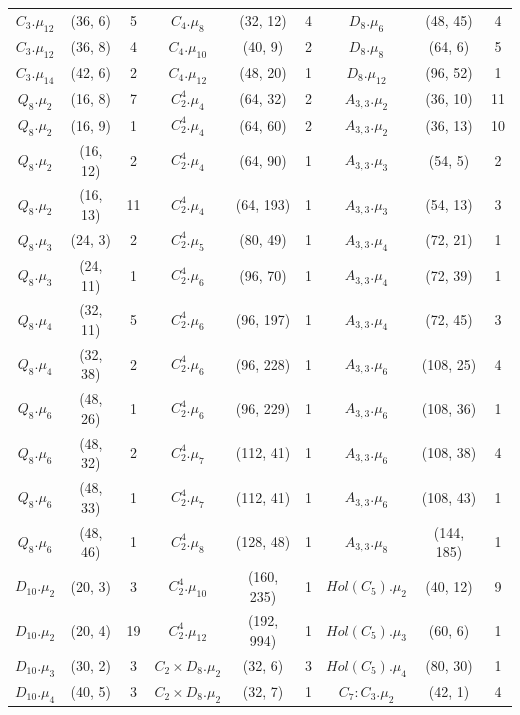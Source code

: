 \documentclass[a4paper]{amsart}
\theoremstyle{definition}
\theoremstyle{plain}
\begin{document}
{\begin{longtable}{ccc|ccc|ccc}
$C_3.\mu_{12}$&(36, 6)&5   &  $C_4.\mu_{8}$&(32, 12)&4 & $D_8.\mu_{6}$&(48, 45)&4\\
\rowcolor{lightgray}
$C_3.\mu_{12}$&(36, 8)&4   &  $C_4.\mu_{10}$&(40, 9)&2 & $D_8.\mu_{8}$&(64, 6)&5\\
$C_3.\mu_{14}$&(42, 6)&2   &  $C_4.\mu_{12}$&(48, 20)&1 & $D_8.\mu_{12}$&(96, 52)&1\\
\rowcolor{lightgray}
$Q_8.\mu_{2}$&(16, 8)&7 & $C_2^4.\mu_{4}$&(64, 32)&2 & $A_{3,3}.\mu_{2}$&(36, 10)&11\\
$Q_8.\mu_{2}$&(16, 9)&1 & $C_2^4.\mu_{4}$&(64, 60)&2 & $A_{3,3}.\mu_{2}$&(36, 13)&10\\
\rowcolor{lightgray}
$Q_8.\mu_{2}$&(16, 12)&2 & $C_2^4.\mu_{4}$&(64, 90)&1 & $A_{3,3}.\mu_{3}$&(54, 5)&2\\
$Q_8.\mu_{2}$&(16, 13)&11 & $C_2^4.\mu_{4}$&(64, 193)&1 & $A_{3,3}.\mu_{3}$&(54, 13)&3\\
\rowcolor{lightgray}
$Q_8.\mu_{3}$&(24, 3)&2 & $C_2^4.\mu_{5}$&(80, 49)&1 & $A_{3,3}.\mu_{4}$&(72, 21)&1\\
$Q_8.\mu_{3}$&(24, 11)&1 & $C_2^4.\mu_{6}$&(96, 70)&1 & $A_{3,3}.\mu_{4}$&(72, 39)&1\\
\rowcolor{lightgray}
$Q_8.\mu_{4}$&(32, 11)&5 & $C_2^4.\mu_{6}$&(96, 197)&1 & $A_{3,3}.\mu_{4}$&(72, 45)&3\\
$Q_8.\mu_{4}$&(32, 38)&2 & $C_2^4.\mu_{6}$&(96, 228)&1 & $A_{3,3}.\mu_{6}$&(108, 25)&4\\
\rowcolor{lightgray}
$Q_8.\mu_{6}$&(48, 26)&1 & $C_2^4.\mu_{6}$&(96, 229)&1 & $A_{3,3}.\mu_{6}$&(108, 36)&1\\
$Q_8.\mu_{6}$&(48, 32)&2 & $C_2^4.\mu_{7}$&(112, 41)&1 & $A_{3,3}.\mu_{6}$&(108, 38)&4\\
\rowcolor{lightgray}
$Q_8.\mu_{6}$&(48, 33)&1 & $C_2^4.\mu_{7}$&(112, 41)&1 & $A_{3,3}.\mu_{6}$&(108, 43)&1\\
$Q_8.\mu_{6}$&(48, 46)&1 & $C_2^4.\mu_{8}$&(128, 48)&1 & $A_{3,3}.\mu_{8}$&(144, 185)&1\\
\rowcolor{lightgray}
$D_{10}.\mu_{2}$&(20, 3)&3 & $C_2^4.\mu_{10}$&(160, 235)&1 & $Hol(C_5).\mu_{2}$&(40, 12)&9\\
$D_{10}.\mu_{2}$&(20, 4)&19 & $C_2^4.\mu_{12}$&(192, 994)&1 & $Hol(C_5).\mu_{3}$&(60, 6)&1\\
\rowcolor{lightgray}
$D_{10}.\mu_{3}$&(30, 2)&3 & $C_2 \times D_8.\mu_{2}$&(32, 6)&3 & $Hol(C_5).\mu_{4}$&(80, 30)&1\\
$D_{10}.\mu_{4}$&(40, 5)&3 & $C_2 \times D_8.\mu_{2}$&(32, 7)&1 & $C_7:C_3.\mu_{2}$&(42, 1)&4\\

\end{longtable}}
\end{document}
